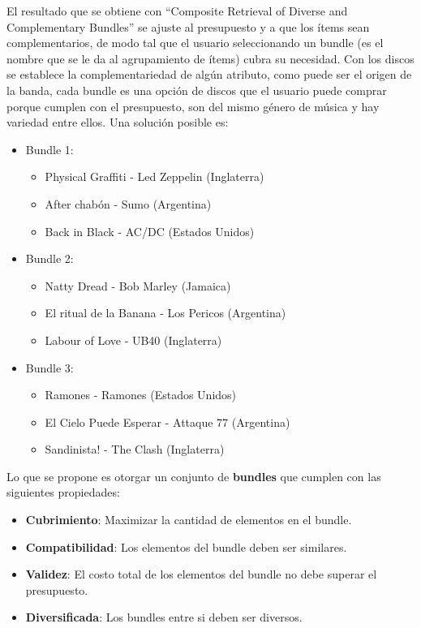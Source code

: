 El resultado que se obtiene con ``Composite Retrieval of Diverse and Complementary Bundles'' se ajuste al presupuesto y a que los ítems sean complementarios, de modo tal que el usuario seleccionando un bundle (es el nombre que se le da al agrupamiento de ítems) cubra su necesidad. Con los discos se establece la complementariedad de algún atributo, como puede ser el origen de la banda, cada bundle es una opción de discos que el usuario puede comprar porque cumplen con el presupuesto, son del mismo género de música y hay variedad entre ellos. Una solución posible es:
\begin{itemize}
  \item Bundle 1:
  \begin{itemize}
    \item Physical Graffiti - Led Zeppelin (Inglaterra)
    \item After chabón - Sumo (Argentina)
    \item Back in Black - AC/DC (Estados Unidos)
  \end{itemize}
  \item Bundle 2:
  \begin{itemize}
    \item Natty Dread - Bob Marley (Jamaica)
    \item El ritual de la Banana - Los Pericos (Argentina)
    \item Labour of Love - UB40 (Inglaterra)
  \end{itemize}
	  \item Bundle 3:
  \begin{itemize}
    \item Ramones - Ramones (Estados Unidos)
    \item El Cielo Puede Esperar - Attaque 77 (Argentina)
    \item Sandinista! - The Clash (Inglaterra)
  \end{itemize}
\end{itemize}

Lo que se propone es otorgar un conjunto de \textbf{bundles} que cumplen con las siguientes propiedades:
\begin{itemize}
  \item \textbf{Cubrimiento}: Maximizar la cantidad de elementos en el bundle.
  \item \textbf{Compatibilidad}: Los elementos del bundle deben ser similares.
  \item \textbf{Validez}: El costo total de los elementos del bundle no debe superar el presupuesto.
  \item \textbf{Diversificada}: Los bundles entre si deben ser diversos.
\end{itemize}
